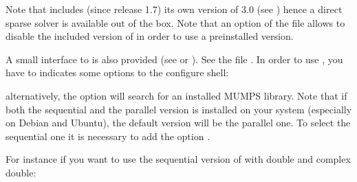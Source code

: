 \documentclass[a4paper,11pt,english]{sphinxmanual}
\begin{document}
Note that  includes (since release 1.7) its own version of  3.0 (see
) hence a direct sparse
solver is available out of the box. Note that an option of the 
file allows to disable the included version of  in order to use a
pre\sphinxhyphen{}installed version.

A small interface to  is also provided (see  or ). See the file
. In order to use , you have to indicates
some options to the configure shell:

\begin{sphinxVerbatim}[commandchars=\\\{\}]
\end{sphinxVerbatim}

alternatively, the option  will search for an installed MUMPS library. Note that if both the sequential and the parallel version is installed on your system (especially on Debian and Ubuntu), the default version will be the parallel one. To select the sequential one it is necessary to add the option .

For instance if you want to use the sequential version of  with double and
complex double:

\begin{sphinxVerbatim}[commandchars=\\\{\}]
               
\end{sphinxVerbatim}
\end{document}
